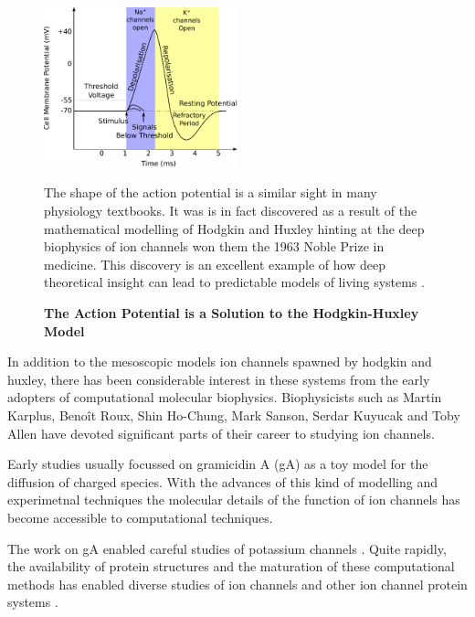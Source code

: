 \begin{figure}
	\begin{center}
		\includegraphics[width=0.5\textwidth]{figures/Hodgkin-Huxley_action_potential.pdf}
	\end{center}
	\captionsetup{singlelinecheck = false, justification=raggedright}
	\caption[The Action Potential is a Solution to the Hodkin-Huxley Model] {\textbf{The Action Potential is a Solution to the Hodgkin-Huxley Model }}{The shape of the action potential is a similar sight in many physiology textbooks. It was is in fact discovered as a result of the mathematical modelling of Hodgkin and Huxley hinting at the deep biophysics of ion channels won them the 1963 Noble Prize in medicine. This discovery is an excellent example of how deep theoretical insight can lead to predictable models of living systems \cite{hodgkin1952, hodgkin1952a, hodgkin1952b, hodgkin1952c, hodgkin1952d}.}
	\label{action_potential_graphic}
\end{figure}

In addition to the mesoscopic models ion channels spawned by hodgkin and huxley, there has been considerable interest in these systems from  the early adopters of computational molecular biophysics. Biophysicists such as Martin Karplus, Beno\^it Roux, Shin Ho-Chung, Mark Sanson, Serdar Kuyucak and Toby Allen have devoted significant parts of their career to studying ion channels\cite{sansom1991, roux1991, sansom1991, allen2003, allen2004, chung2002, tieleman2001}. 

Early studies usually focussed on gramicidin A (gA) as a toy model for the diffusion of charged species. With the advances of this kind of modelling and experimetnal techniques the molecular details of the function of ion channels has become accessible to computational techniques. 

The work on gA enabled careful studies of potassium channels \cite{rashid2013, li2021, vandenberg2021}. Quite rapidly, the availability of protein structures and the maturation of these computational methods has enabled diverse studies of ion channels and other ion channel protein systems \cite{lev2020, chen2021}.



